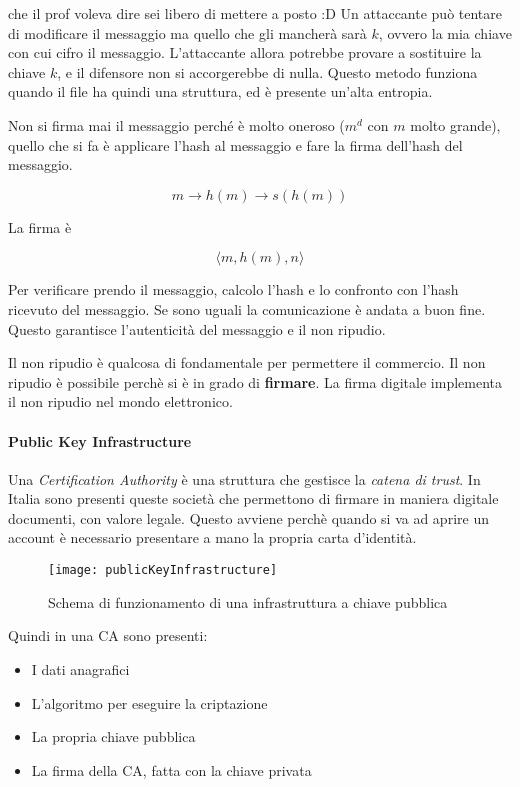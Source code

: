che il prof voleva dire sei libero di mettere a posto :D
Un attaccante può tentare di modificare il messaggio ma quello che gli mancherà
sarà $k$, ovvero la mia chiave con cui cifro il messaggio.
L'attaccante allora potrebbe provare a sostituire la chiave $k$, e il difensore
non si accorgerebbe di nulla. Questo metodo funziona quando il file ha quindi
una struttura, ed è presente un'alta entropia.

Non si firma mai il messaggio perché è molto oneroso ($m^d$ con $m$ molto
grande), quello che si fa è applicare l'hash al messaggio e fare la firma
dell'hash del messaggio.

$$
m \rightarrow h(m) \rightarrow s(h(m))
$$

La firma è

$$
\langle m, h(m), n \rangle
$$

Per verificare prendo il messaggio, calcolo l'hash e lo confronto con l'hash
ricevuto del messaggio. Se sono uguali la comunicazione è andata a buon fine.
Questo garantisce l'autenticità del messaggio e il non ripudio.

Il non ripudio è qualcosa di fondamentale per permettere il commercio. Il non
ripudio è possibile perchè si è in grado di \textbf{firmare}. La firma digitale
implementa il non ripudio nel mondo elettronico.

\paragraph{Public Key Infrastructure}

Una \textit{Certification Authority} è una struttura che gestisce la
\textit{catena di trust}. In Italia sono presenti queste società che permettono
di firmare in maniera digitale documenti, con valore legale. Questo avviene
perchè quando si va ad aprire un account è necessario presentare a mano la
propria carta d'identità.


\begin{figure}[H]
 \centering
 \texttt{[image: publicKeyInfrastructure]}
 \caption{Schema di funzionamento di una infrastruttura a chiave pubblica}
\end{figure}

Quindi in una CA sono presenti:
\begin{itemize}
\item I dati anagrafici
\item L'algoritmo per eseguire la criptazione
\item La propria chiave pubblica
\item La firma della CA, fatta con la chiave privata
\end{itemize}


